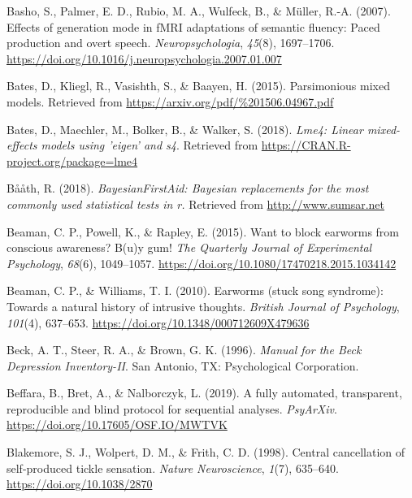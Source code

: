 \documentclass[a4paper,12pt,twoside,onecolumn,openright,final,oldfontcommands]{memoir}
\begin{document}
\leavevmode\hypertarget{ref-basho_effects_2007}{}%
Basho, S., Palmer, E. D., Rubio, M. A., Wulfeck, B., \& Müller, R.-A. (2007). Effects of generation mode in fMRI adaptations of semantic fluency: Paced production and overt speech. \emph{Neuropsychologia}, \emph{45}(8), 1697--1706. \url{https://doi.org/10.1016/j.neuropsychologia.2007.01.007}

\leavevmode\hypertarget{ref-bates_parsimonious_2015}{}%
Bates, D., Kliegl, R., Vasishth, S., \& Baayen, H. (2015). Parsimonious mixed models. Retrieved from \url{https://arxiv.org/pdf/\%201506.04967.pdf}

\leavevmode\hypertarget{ref-R-lme4}{}%
Bates, D., Maechler, M., Bolker, B., \& Walker, S. (2018). \emph{Lme4: Linear mixed-effects models using 'eigen' and s4}. Retrieved from \url{https://CRAN.R-project.org/package=lme4}

\leavevmode\hypertarget{ref-R-BayesianFirstAid}{}%
Bååth, R. (2018). \emph{BayesianFirstAid: Bayesian replacements for the most commonly used statistical tests in r.} Retrieved from \url{http://www.sumsar.net}

\leavevmode\hypertarget{ref-Beaman2015}{}%
Beaman, C. P., Powell, K., \& Rapley, E. (2015). Want to block earworms from conscious awareness? B(u)y gum! \emph{The Quarterly Journal of Experimental Psychology}, \emph{68}(6), 1049--1057. \url{https://doi.org/10.1080/17470218.2015.1034142}

\leavevmode\hypertarget{ref-Beaman2010}{}%
Beaman, C. P., \& Williams, T. I. (2010). Earworms (stuck song syndrome): Towards a natural history of intrusive thoughts. \emph{British Journal of Psychology}, \emph{101}(4), 637--653. \url{https://doi.org/10.1348/000712609X479636}

\leavevmode\hypertarget{ref-beck_manual_1996}{}%
Beck, A. T., Steer, R. A., \& Brown, G. K. (1996). \emph{Manual for the Beck Depression Inventory-II}. San Antonio, TX: Psychological Corporation.

\leavevmode\hypertarget{ref-beffara_fully_2019}{}%
Beffara, B., Bret, A., \& Nalborczyk, L. (2019). A fully automated, transparent, reproducible and blind protocol for sequential analyses. \emph{PsyArXiv}. \url{https://doi.org/10.17605/OSF.IO/MWTVK}

\leavevmode\hypertarget{ref-blakemore_central_1998}{}%
Blakemore, S. J., Wolpert, D. M., \& Frith, C. D. (1998). Central cancellation of self-produced tickle sensation. \emph{Nature Neuroscience}, \emph{1}(7), 635--640. \url{https://doi.org/10.1038/2870}
\end{document}
